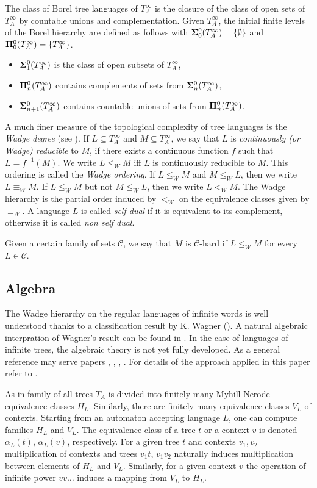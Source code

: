 The class of Borel tree languages of $T^\infty_A$ is the
closure of the class of open sets of $T^\infty_A$ by countable unions and
complementation. Given $T^\infty_A$, the initial finite levels of the
Borel hierarchy are defined as follows with ${\bf\Sigma}^0_0(T^\infty_A)= \{\emptyset\}$ and
${\bf\Pi}^0_0(T^\infty_A)=\{T^\infty_A \}$.
\begin{itemize}
\item ${\bf\Sigma}^0_1(T^\infty_A)$ is the class of open subsets of $T^\infty_A$, 
\item ${\bf\Pi}^0_n(T^\infty_A)$ contains complements of sets from ${\bf\Sigma}^0_n(T^\infty_A)$, 
\item ${\bf\Sigma}^0_{n+1}(T^\infty_A)$ contains countable unions of sets from ${\bf\Pi}^0_n(T^\infty_A)$. 
\end{itemize}

A much finer measure of the topological complexity of tree languages is the \emph{Wadge degree} (see \cite[Chapter 21.E]{kechris}).
If $L \subseteq T^\infty_A$ and $M\subseteq T^\infty_A$, we say that $L$ is \emph{continuously (or Wadge)
reducible} to $M$, if there exists a continuous function $f$ such that $L=
f^{-1}(M)$. We write $L \leq_W M$ iff $L$ is continuously reducible to $M$.
This ordering is called the {\em Wadge ordering}. If $L \leq_W M$ and $M \leq_W L$, then we write $L
\equiv_W M$. If $L \leq_W M$ but not $M \leq_W L$, then we write $L<_W
M$. The Wadge hierarchy is the partial order induced by $<_W$ on the
equivalence classes given by $\equiv_W$. A language  $L$ is called {\em self dual} if it is equivalent 
to its complement, otherwise it is called {\em non self dual}.


Given a certain family of sets $\mathcal{C}$, we say that $M$ is $\mathcal{C}$-hard if $L
\leq_W M$ for every $L \in \mathcal{C}$.   

\subsection{Algebra}
The Wadge hierarchy on the regular languages of infinite words is well understood thanks to a classification result by K. Wagner (\cite{wagner}). A natural algebraic interpration of Wagner's result can be found in \cite[Theorem 6.2]{pinperrin}. In the case of languages of infinite trees, the algebraic theory is not yet fully developed. As a general reference may serve papers \cite{blumensath}, \cite{bp}, \cite{bojtrees}, \cite{bojidziaszek}. For details of the approach applied in this paper refer to \cite[Section 3]{bp}. 

As in \cite{bp} family of all trees $T_A$ is divided into finitely many Myhill-Nerode equivalence classes $H_L$. Similarly, there are finitely many equivalence classes $V_L$ of contexts. Starting from an automaton accepting language $L$, one can compute families $H_L$ and $V_L$. The equivalence class of a tree $t$ or a context $v$ is denoted $\alpha_L(t)$, $\alpha_L(v)$, respectively. For a given tree $t$ and contexts $v_1,v_2$ multiplication of contexts and trees $v_1t$, $v_1v_2$ naturally induces multiplication between elements of $H_L$ and $V_L$. Similarly, for a given context $v$ the operation of infinite power $vv\ldots$ induces a mapping from $V_L$ to $H_L$. 



